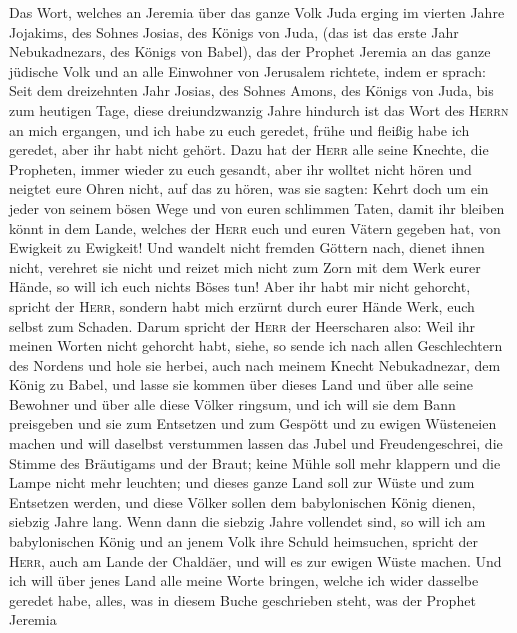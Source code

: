  Das Wort, welches an Jeremia über das ganze Volk Juda
erging im vierten Jahre Jojakims, des Sohnes Josias, des Königs von
Juda, (das ist das erste Jahr Nebukadnezars, des Königs von Babel),
 das der Prophet Jeremia an das ganze jüdische Volk und an
alle Einwohner von Jerusalem richtete, indem er sprach: 
Seit dem dreizehnten Jahr Josias, des Sohnes Amons, des Königs von Juda,
bis zum heutigen Tage, diese dreiundzwanzig Jahre hindurch ist das Wort
des \textsc{Herrn} an mich ergangen, und ich habe zu euch geredet, frühe
und fleißig habe ich geredet, aber ihr habt nicht gehört. 
Dazu hat der \textsc{Herr} alle seine Knechte, die Propheten, immer
wieder zu euch gesandt, aber ihr wolltet nicht hören und neigtet eure
Ohren nicht, auf das zu hören, was sie sagten:  Kehrt doch
um ein jeder von seinem bösen Wege und von euren schlimmen Taten, damit
ihr bleiben könnt in dem Lande, welches der \textsc{Herr} euch und euren
Vätern gegeben hat, von Ewigkeit zu Ewigkeit!  Und wandelt
nicht fremden Göttern nach, dienet ihnen nicht, verehret sie nicht und
reizet mich nicht zum Zorn mit dem Werk eurer Hände, so will ich euch
nichts Böses tun!  Aber ihr habt mir nicht gehorcht,
spricht der \textsc{Herr}, sondern habt mich erzürnt durch eurer Hände
Werk, euch selbst zum Schaden.  Darum spricht der
\textsc{Herr} der Heerscharen also:  Weil ihr meinen
Worten nicht gehorcht habt, siehe, so sende ich nach allen Geschlechtern
des Nordens und hole sie herbei, auch nach meinem Knecht Nebukadnezar,
dem König zu Babel, und lasse sie kommen über dieses Land und über alle
seine Bewohner und über alle diese Völker ringsum, und ich will sie dem
Bann preisgeben und sie zum Entsetzen und zum Gespött und zu ewigen
Wüsteneien machen  und will daselbst verstummen lassen
das Jubel und Freudengeschrei, die Stimme des Bräutigams und der Braut;
keine Mühle soll mehr klappern und die Lampe nicht mehr leuchten;
 und dieses ganze Land soll zur Wüste und zum Entsetzen
werden, und diese Völker sollen dem babylonischen König dienen, siebzig
Jahre lang.  Wenn dann die siebzig Jahre vollendet sind,
so will ich am babylonischen König und an jenem Volk ihre Schuld
heimsuchen, spricht der \textsc{Herr}, auch am Lande der Chaldäer, und
will es zur ewigen Wüste machen.  Und ich will über jenes
Land alle meine Worte bringen, welche ich wider dasselbe geredet habe,
alles, was in diesem Buche geschrieben steht, was der Prophet Jeremia
